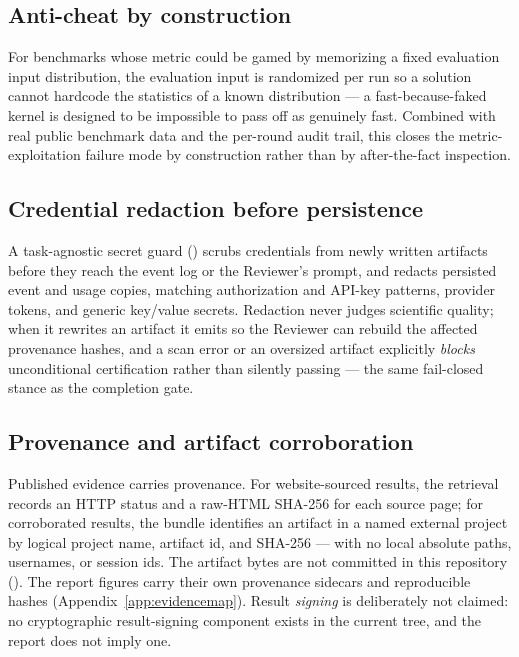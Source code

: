 \subsection{Anti-cheat by construction}

For benchmarks whose metric could be gamed by memorizing a fixed evaluation input
distribution, the evaluation input is randomized per run so a solution cannot
hardcode the statistics of a known distribution --- a fast-because-faked kernel is
designed to be impossible to pass off as genuinely fast. Combined with real public
benchmark data and the per-round audit trail, this closes the metric-exploitation
failure mode by construction rather than
by after-the-fact inspection.

\subsection{Credential redaction before persistence}

A task-agnostic secret guard () scrubs credentials
from newly written artifacts before they reach the event log or the Reviewer's
prompt, and redacts persisted event and usage copies, matching authorization and
API-key patterns, provider tokens, and generic key/value secrets. Redaction never
judges scientific quality; when it rewrites an artifact it emits
 so the Reviewer can rebuild the affected provenance
hashes, and a scan error or an oversized artifact explicitly \emph{blocks}
unconditional certification rather than silently passing --- the same fail-closed
stance as the completion gate.

\subsection{Provenance and artifact corroboration}

Published evidence carries provenance. For website-sourced results, the retrieval
records an HTTP status and a raw-HTML SHA-256 for each source page; for
corroborated results, the bundle identifies an artifact in a named external
project by logical project name, artifact id, and SHA-256 --- with no local
absolute paths, usernames, or session ids. The artifact bytes are not committed
in this repository (). The report figures
carry their own provenance sidecars and reproducible hashes
(Appendix~\ref{app:evidencemap}). Result \emph{signing} is deliberately not
claimed: no cryptographic result-signing component exists in the current tree, and
the report does not imply one.

